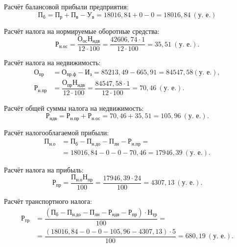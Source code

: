 Расчёт балансовой прибыли предприятия:
\begin{equation*}
  \text{П}_{\text{б}} = \text{П}_{\text{р}} + \text{П}_{\text{в}} - \text{У}_{\text{в}} =
  18016{,}84 + 0 - 0 =
  18016{,}84 \: (\text{у.~е.}) 
\end{equation*}

Расчёт налога на нормируемые оборотные средства:
\begin{equation*}
  \text{Р}_{\text{н.ос}} = 
  \dfrac{\text{О}_{\text{ос}} \text{Н}_{\text{ндв}}}{12 \cdot 100} =
  \dfrac{42606{,}74 \cdot 1}{12 \cdot 100} =
  35{,}51 \: (\text{у.~е.}).
\end{equation*}

Расчёт налога на недвижимость:
\begin{align*}
  \text{О}_{\text{пр}} &= \text{О}_{\text{пр.ф}} - \text{И}_{\text{з}} =
  85213{,}49 - 665{,}91 = 84547{,}58 (\text{у.~е.}), \\
  \text{Р}_{\text{н.пр}} &= 
  \dfrac{\text{О}_{\text{пр}} \text{Н}_{\text{ндв}}}{12 \cdot 100} =
  \dfrac{84547{,}58 \cdot 1}{12 \cdot 100} = 
  70{,}46 \: (\text{у.~е.}).
\end{align*}

Расчёт общей суммы налога на недвижимость:
\begin{equation*}
  \text{Р}_{\text{ндв}} = \text{Р}_{\text{н.пр}} + \text{Р}_{\text{н.ос}} =
  70{,}46 + 35{,}51 =
  105{,}96 \: (\text{у.~е.}).
\end{equation*}

Расчёт налогооблагаемой прибыли:
\begin{align*}
  \text{П}_{\text{н.о}} &= \text{П}_{\text{б}} - 
  \text{П}_{\text{н.до}} - \text{П}_{\text{лн}}  - \text{Р}_{\text{н.пр}} = \\
  &= 18016{,}84 - 0 - 0 - 70{,}46 =
  17946{,}39 \: (\text{у.~е.}).
\end{align*}

Расчёт налога на прибыль:
\begin{equation*}
  \text{Р}_{\text{пр}} = 
  \dfrac{\text{П}_{\text{н.о}} \text{Н}_{\text{пр}}}{100} =
  \dfrac{17946{,}39 \cdot 24}{100} =
  4307{,}13 \: (\text{у.~е.}).
\end{equation*}

Расчёт транспортного налога:
\begin{align*}
  \text{Р}_{\text{тр}} &= 
  \dfrac{
    (\text{П}_{\text{б}} - \text{П}_{\text{н.до}} - \text{П}_{\text{лн}} - 
    \text{Р}_{\text{ндв}} - \text{Р}_{\text{пр}}) \cdot \text{Н}_{\text{тр}}
  }{100} = \\
  &= \dfrac{(18016{,}84 - 0 - 0 - 105{,}96 - 4307{,}13) \cdot 5}{100} =
  680{,}19 \: (\text{у.~е.}).
\end{align*}

